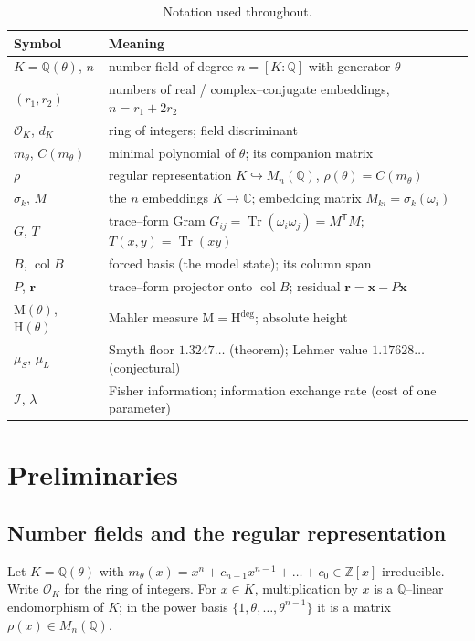\documentclass[11pt]{article}
\theoremstyle{plain}
\theoremstyle{definition}
\theoremstyle{remark}
\newcommand{\Q}{\mathbb{Q}}
\newcommand{\Z}{\mathbb{Z}}
\newcommand{\C}{\mathbb{C}}
\newcommand{\K}{K}
\newcommand{\OK}{\mathcal{O}_K}
\newcommand{\Tr}{\operatorname{Tr}}
\newcommand{\Mah}{\mathrm{M}}
\newcommand{\height}{\mathrm{H}}
\newcommand{\Fish}{\mathcal{I}}
\newcommand{\rr}{\mathbf{r}}
\newcommand{\xx}{\mathbf{x}}
\newcommand{\GG}{G}
\newcommand{\BB}{B}
\newcommand{\transpose}{^{\mathsf{T}}}
\DeclareMathOperator{\col}{col}
\begin{document}
\begin{table}[ht]
\centering
\small
\begin{tabular}{ll}
\toprule
Symbol & Meaning \\
\midrule
$\K=\Q(\theta)$, $n$ & number field of degree $n=[\K:\Q]$ with generator $\theta$ \\
$(r_1,r_2)$ & numbers of real / complex--conjugate embeddings, $n=r_1+2r_2$ \\
$\OK$, $d_\K$ & ring of integers; field discriminant \\
$m_\theta$, $C(m_\theta)$ & minimal polynomial of $\theta$; its companion matrix \\
$\rho$ & regular representation $\K\hookrightarrow M_n(\Q)$, $\rho(\theta)=C(m_\theta)$ \\
$\sigma_k$, $M$ & the $n$ embeddings $\K\to\C$; embedding matrix $M_{ki}=\sigma_k(\omega_i)$ \\
$\GG$, $T$ & trace--form Gram $\GG_{ij}=\Tr(\omega_i\omega_j)=M\transpose M$; $T(x,y)=\Tr(xy)$ \\
$\BB$, $\col\BB$ & forced basis (the model state); its column span \\
$P$, $\rr$ & trace--form projector onto $\col\BB$; residual $\rr=\xx-P\xx$ \\
$\Mah(\theta)$, $\height(\theta)$ & Mahler measure $\Mah=\height^{\deg}$; absolute height \\
$\mu_S$, $\mu_L$ & Smyth floor $1.3247\ldots$ (theorem); Lehmer value $1.17628\ldots$ (conjectural) \\
$\Fish$, $\lambda$ & Fisher information; information exchange rate (cost of one parameter) \\
\bottomrule
\end{tabular}
\caption{Notation used throughout.}
\label{tab:notation}
\end{table}

\section{Preliminaries}\label{sec:prelim}

\subsection{Number fields and the regular representation}
Let $\K=\Q(\theta)$ with $m_\theta(x)=x^n+c_{n-1}x^{n-1}+\dots+c_0\in\Z[x]$ irreducible. Write
$\OK$ for the ring of integers. For $x\in\K$, multiplication by $x$ is a $\Q$--linear endomorphism of $\K$;
in the power basis $\{1,\theta,\dots,\theta^{n-1}\}$ it is a matrix $\rho(x)\in M_n(\Q)$.
\end{document}
